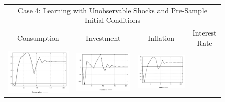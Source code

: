 \begin{figure}
\begin{tabular}{cccc}
\multicolumn{4}{c}{Case 4: Learning with Unobservable Shocks and Pre-Sample Initial Conditions}\\
Consumption & Investment & Inflation & Interest Rate \\ 
\includegraphics[scale=0.22]{results_wlsinit/Consumption_prefshock_irf.png} & 
\includegraphics[scale=0.22]{results_wlsinit/Investment_prefshock_irf.png} & 
\includegraphics[scale=0.22]{results_wlsinit/Inflation_prefshock_irf.png} & 

\end{tabular}
\end{figure}
